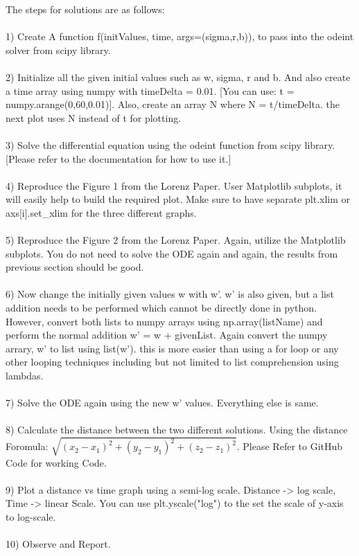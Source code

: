 \documentclass{article}
\begin{document}
The steps for solutions are as follows: \\\\
1) Create A function f(initValues, time, args=(sigma,r,b)), to pass into the odeint solver from scipy library. \\\\
2) Initialize all the given initial values such as w, sigma, r and b. And also create a time array using numpy with timeDelta = 0.01. [You can use: t = numpy.arange(0,60,0.01)]. Also, create an array N where N = t/timeDelta. the next plot uses N instead of t for plotting.\\\\
3) Solve the differential equation using the odeint function from scipy library. [Please refer to the documentation for how to use it.]\\\\
4) Reproduce the Figure 1 from the Lorenz Paper. User Matplotlib subplots, it will easily help to build the required plot. Make sure to have separate plt.xlim or axs[i].set\_xlim for the three different graphs.\\\\ 
5) Reproduce the Figure 2 from the Lorenz Paper. Again, utilize the Matplotlib subplots. You do not need to solve the ODE again and again, the results from previous section should be good.\\\\
6) Now change the initially given values w with w'. w' is also given, but a list addition needs to be performed which cannot be directly done in python. However, convert both lists to numpy arrays using np.array(listName) and perform the normal addition w' = w + givenList. Again convert the numpy arrary, w' to list using list(w'). this is more easier than using a for loop or any other looping techniques including but not limited to list comprehension using lambdas.  \\\\
7) Solve the ODE again using the new w' values. Everything else is same.\\\\
8) Calculate the distance between the two different solutions. Using the distance Foromula: $\sqrt{(x_2 - x_1)^2 + (y_2-y_1)^2 + (z_2-z_1)^2}$. Please Refer to GitHub  Code for working Code.\\\\
9) Plot a distance vs time graph using a semi-log scale. Distance -> log scale, Time -> linear Scale. You can use plt.yscale("log") to the set the scale of y-axis to log-scale. \\\\
10) Observe and Report.\\\\
\end{document}
